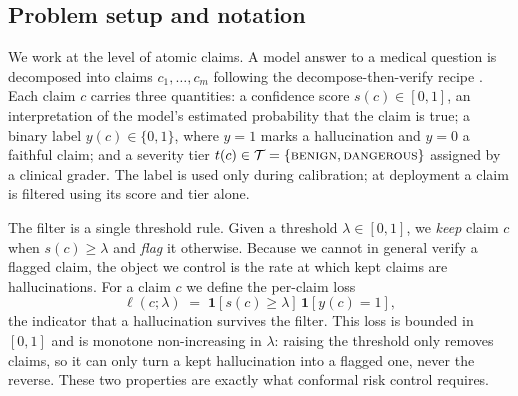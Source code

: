 \documentclass[11pt]{article}
\begin{document}
\subsection{Problem setup and notation}
\label{sec:setup}
We work at the level of atomic claims. A model answer to a medical question is
decomposed into claims $c_1, \dots, c_m$ following the decompose-then-verify
recipe \citep{min2023factscore, mohri2024conformal}. Each claim $c$ carries three
quantities: a confidence score $s(c) \in [0,1]$, an interpretation of the model's
estimated probability that the claim is true; a binary label $y(c) \in \{0, 1\}$,
where $y=1$ marks a hallucination and $y=0$ a faithful claim; and a severity tier
$t(c) \in \mathcal{T} = \{\textsc{benign}, \textsc{dangerous}\}$ assigned by a
clinical grader. The label is used only during calibration; at deployment a claim
is filtered using its score and tier alone.

The filter is a single threshold rule. Given a threshold $\lambda \in [0,1]$, we
\emph{keep} claim $c$ when $s(c) \ge \lambda$ and \emph{flag} it otherwise.
Because we cannot in general verify a flagged claim, the object we control is the
rate at which kept claims are hallucinations. For a claim $c$ we define the
per-claim loss
\begin{equation}
\ell(c; \lambda) \;=\; \mathbf{1}\!\left[s(c) \ge \lambda\right]\,
\mathbf{1}\!\left[y(c) = 1\right],
\label{eq:loss}
\end{equation}
the indicator that a hallucination survives the filter. This loss is bounded in
$[0,1]$ and is monotone non-increasing in $\lambda$: raising the threshold only
removes claims, so it can only turn a kept hallucination into a flagged one, never
the reverse. These two properties are exactly what conformal risk control requires.
\end{document}
